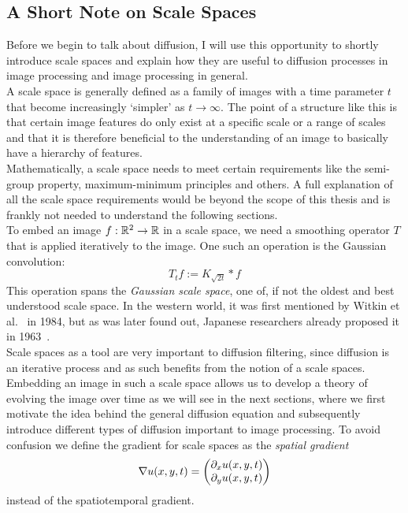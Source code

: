 \subsection{A Short Note on Scale Spaces}\label{sub:ScaleSpaces}
Before we begin to talk about diffusion, I will use this opportunity to shortly introduce scale
spaces and explain how they are useful to diffusion processes in image processing and image
processing in general.\\
A scale space is generally defined as a family of images with a time parameter $t$ that become
increasingly `simpler' as $t \to \infty$. The point of a structure like this is that certain image
features do only exist at a specific scale or a range of scales and that it is therefore beneficial
to the understanding of an image to basically have a hierarchy of features.\\
Mathematically, a scale
space needs to meet certain requirements like the semi-group property, maximum-minimum principles
and others.\newpage\noindent
A full explanation of all the scale space requirements would be beyond the scope of this thesis
and is frankly not needed to understand the following sections.\\
To embed an image $f:\mathbb{R}^2 \rightarrow \mathbb{R}$ in a scale space, we need a smoothing
operator $T$ that is applied iteratively to the image. One such an operation is the Gaussian
convolution: 
\begin{equation}
    T_{t}f := K_{\sqrt{2t}} * f
\end{equation}
This operation spans the \textit{Gaussian scale space}, one of, if not the oldest and best
understood scale space. In the western world, it was first mentioned by Witkin et
al.~\cite{witkin84} in 1984, but as was later found out, Japanese researchers already proposed it in
1963~\cite{weickert-ishikawa}.\\
Scale spaces as a tool are very important to diffusion filtering, since diffusion is an iterative
process and as such benefits from the notion of a scale spaces. Embedding an image in such a scale
space allows us to develop a theory of evolving the image over time as we will see in the next
sections, where we first motivate the idea behind the general diffusion equation and
subsequently introduce different types of diffusion important to image processing.
To avoid confusion we define the gradient for scale spaces as the \textit{spatial gradient} 
\begin{equation}
    \mathbf{\nabla} u(x, y, t) = \begin{pmatrix}
        \partial_x u(x, y, t)\\
        \partial_y u(x, y, t)
    \end{pmatrix} 
\end{equation}
instead of the spatiotemporal gradient.

